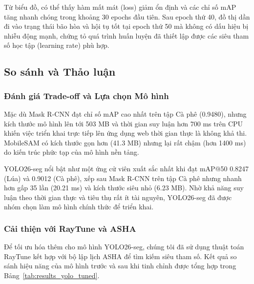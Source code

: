 Từ biểu đồ, có thể thấy hàm mất mát (loss) giảm ổn định và các chỉ số mAP tăng nhanh chóng trong khoảng 30 epochs đầu tiên. Sau epoch thứ 40, đồ thị dần đi vào trạng thái bão hòa và hội tụ tốt tại epoch thứ 50 mà không có dấu hiệu bị nhiễu động mạnh, chứng tỏ quá trình huấn luyện đã thiết lập được các siêu tham số học tập (learning rate) phù hợp.

\subsection{So sánh và Thảo luận}

\subsubsection{Đánh giá Trade-off và Lựa chọn Mô hình}
Mặc dù Mask R-CNN đạt chỉ số mAP cao nhất trên tập Cà phê (0.9480), nhưng kích thước mô hình lên tới 503 MB và thời gian suy luận hơn 700 ms trên CPU khiến việc triển khai trực tiếp lên ứng dụng web thời gian thực là không khả thi. MobileSAM có kích thước gọn hơn (41.3 MB) nhưng lại rất chậm (hơn 1400 ms) do kiến trúc phức tạp của mô hình nền tảng.

YOLO26-seg nổi bật như một ứng cử viên xuất sắc nhất khi đạt mAP@50 0.8247 (Lúa) và 0.9012 (Cà phê), xếp sau Mask R-CNN trên tập Cà phê nhưng nhanh hơn gấp 35 lần (20.21 ms) và kích thước siêu nhỏ (6.23 MB). Nhờ khả năng suy luận theo thời gian thực và tiêu thụ rất ít tài nguyên, YOLO26-seg đã được nhóm chọn làm mô hình chính thức để triển khai.

\subsubsection{Cải thiện với RayTune và ASHA}
Để tối ưu hóa thêm cho mô hình YOLO26-seg, chúng tôi đã sử dụng thuật toán RayTune kết hợp với bộ lập lịch ASHA để tìm kiếm siêu tham số. Kết quả so sánh hiệu năng của mô hình trước và sau khi tinh chỉnh được tổng hợp trong Bảng~\ref{tab:results_yolo_tuned}. 

